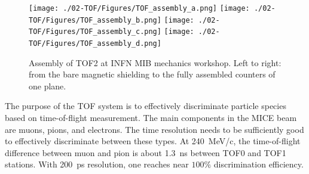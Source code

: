 \begin{figure}
  \begin{center}
  \texttt{[image: ./02-TOF/Figures/TOF\_assembly\_a.png]}
  \texttt{[image: ./02-TOF/Figures/TOF\_assembly\_b.png]}
  \texttt{[image: ./02-TOF/Figures/TOF\_assembly\_c.png]}
  \texttt{[image: ./02-TOF/Figures/TOF\_assembly\_d.png]}
  \caption{Assembly of TOF2 at INFN MIB mechanics workshop. Left to
    right: from the bare magnetic shielding to the fully assembled
    counters of one plane.}
  \label{fig:TOF2}
  \end{center}
\end{figure}





The purpose of the TOF system is to effectively discriminate particle species
based on time-of-flight measurement. The main components in the
MICE beam are muons, pions, and electrons. The time resolution needs
to be sufficiently good to effectively discriminate between these
types. At 240~MeV/c, the time-of-flight difference between muon and
pion is about 1.3~ns between TOF0 and TOF1 stations. With 200~ps
resolution, one reaches near $100\%$ discrimination efficiency.


